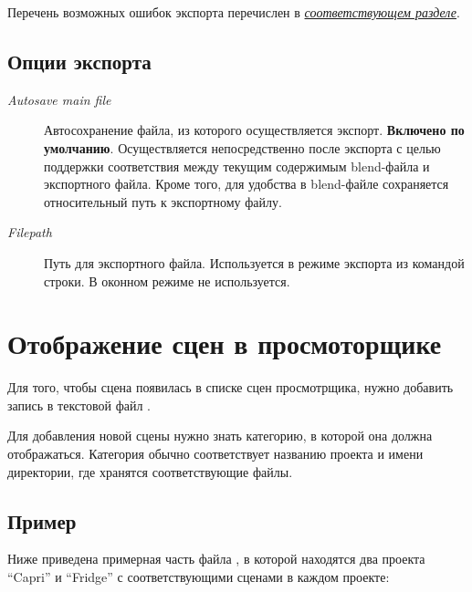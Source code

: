 \documentclass[a4paper,12pt,oneside]{sphinxmanual}
\begin{document}
\begin{DUlineblock}{0em}
\item[] 
\end{DUlineblock}

Перечень возможных ошибок экспорта перечислен в {\hyperref[export_errors:export-errors]{\emph{соответствующем разделе}}}.


\subsection{Опции экспорта}
\label{working_process_stages:id4}\begin{description}
\item[{\emph{Autosave main file}}] \leavevmode
Автосохранение файла, из которого осуществляется экспорт. \textbf{Включено по умолчанию}. Осуществляется непосредственно после экспорта с целью поддержки соответствия между текущим содержимым blend-файла и экспортного файла. Кроме того, для удобства в blend-файле сохраняется относительный путь к экспортному файлу.

\item[{\emph{Filepath}}] \leavevmode
Путь для экспортного файла. Используется в режиме экспорта из командой строки. В оконном режиме не используется.

\end{description}


\section{Отображение сцен в просмоторщике}
\label{working_process_stages:id5}\label{working_process_stages:index-1}
Для того, чтобы сцена появилась в списке сцен просмотрщика, нужно добавить запись в текстовой файл .

Для добавления новой сцены нужно знать категорию, в которой она должна отображаться. Категория обычно соответствует названию проекта и имени директории, где хранятся соответствующие файлы.


\subsection{Пример}
\label{working_process_stages:id6}
Ниже приведена примерная часть файла , в которой находятся два проекта ``Capri'' и ``Fridge'' с соответствующими сценами в каждом проекте:
\end{document}
